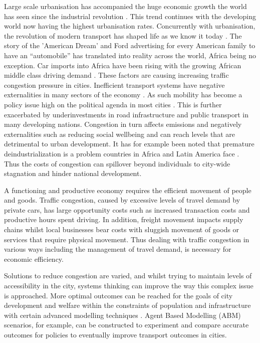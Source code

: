 \documentclass[a4paper]{article}
\begin{document}
Large scale urbanisation has accompanied the huge economic growth the world has seen since the industrial revolution \citep{ritchie2018urbanization}. This trend continues with the developing world now having the highest urbanisation rates. Concurrently with urbanisation, the revolution of modern transport has shaped life as we know it today \citep{rodrigue2020geography}. The story of the 'American Dream' and Ford advertising for every American family to have an “automobile” has translated into reality across the world, Africa being no exception. Car imports into Africa have been rising with the growing African middle class driving demand \citep{organisation2018africa}. These factors are causing increasing traffic congestion pressure in cities. Inefficient transport systems have negative externalities in many sectors of the economy \citep{jabbarpour2018applications, miskolczi2021urban}. As such mobility has become a policy issue high on the political agenda in most cities \citep{costa2017urban, miskolczi2021urban, perveen2017evaluating}. This is further exacerbated by underinvestments in road infrastructure and public transport in many developing nations. Congestion in turn affects emissions and negatively externalities such as reducing social wellbeing and can reach levels that are detrimental to urban development. It has for example been noted that premature deindustrialization is a problem countries in Africa and Latin America face \citep{mcmillan2011globalization}. 
Thus the costs of congestion can spillover beyond individuals to city-wide stagnation and hinder national development. 

A functioning and productive economy requires the efficient movement of people and goods. Traffic congestion, caused by excessive levels of travel demand by private cars, has large opportunity costs such as increased transaction costs and productive hours spent driving. In addition, freight movement impacts supply chains whilst local businesses bear costs with sluggish movement of goods or services that require physical movement. Thus dealing with traffic congestion in various ways including the management of travel demand, is necessary for economic efficiency. 

Solutions to reduce congestion are varied, and whilst trying to maintain levels of accessibility in the city, systems thinking can improve the way this complex issue is approached. More optimal outcomes can be reached for the goals of city development and welfare within the constraints of population and infrastructure with certain advanced modelling techniques \citep{ccolak2016understanding}. Agent Based Modelling (ABM) scenarios, for example, can be constructed to experiment and compare accurate outcomes for policies to eventually improve transport outcomes in cities. 
\end{document}

